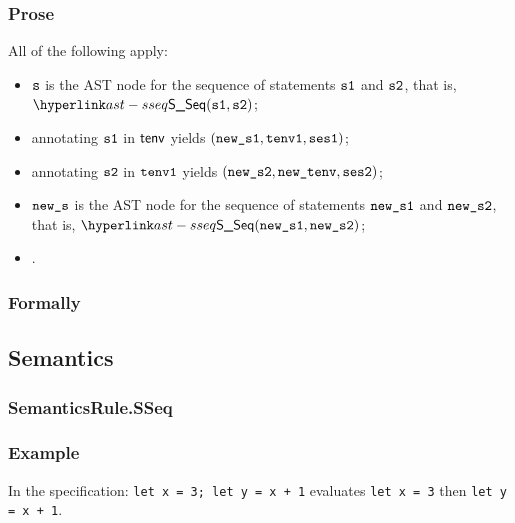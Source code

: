 \subsubsection{Prose}
All of the following apply:
\begin{itemize}
  \item $\vs$ is the AST node for the sequence of statements $\vsone$ and $\vstwo$, that is, $\SSeq(\vsone, \vstwo)$;
  \item annotating $\vsone$ in $\tenv$ yields $(\newsone, \tenvone, \vsesone)$\ProseOrTypeError;
  \item annotating $\vstwo$ in $\tenvone$ yields $(\newstwo, \newtenv, \vsestwo)$\ProseOrTypeError;
  \item $\news$ is the AST node for the sequence of statements $\newsone$ and $\newstwo$, that is, $\SSeq(\newsone, \newstwo)$;
  \item {}.
\end{itemize}
\subsubsection{Formally}
\begin{mathpar}
\end{mathpar}

\subsection{Semantics}
\subsubsection{SemanticsRule.SSeq\label{sec:SemanticsRule.SSeq}}
\subsubsection{Example}
In the specification:
\texttt{let x = 3; let y = x + 1} evaluates \texttt{let x = 3} then \texttt{let y = x + 1}.

